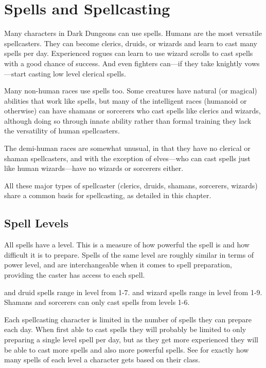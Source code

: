 \chapter[red]{Spells and Spellcasting}
\label{chap:Spells and Spellcasting}
\thispagestyle{plain}

\begin{multicols*}{2}
Many characters in Dark Dungeons can use spells. Humans are the most versatile spellcasters. They can become clerics, druids, or wizards and learn to cast many spells per day. Experienced rogues can learn to use wizard scrolls to cast spells with a good chance of success. And even fighters can—if they take knightly vows—start casting low level clerical spells.

Many non-human races use spells too. Some creatures have natural (or magical) abilities that work like spells, but many of the intelligent races (humanoid or otherwise) can have shamans or sorcerers who cast spells like clerics and wizards, although doing so through innate ability rather than formal training they lack the versatility of human spellcasters.

The demi-human races are somewhat unusual, in that they have no clerical or shaman spellcasters, and with the exception of elves—who can cast spells just like human wizards—have no wizards or sorcerers either.

All these major types of spellcaster (clerics, druids, shamans, sorcerers, wizards) share a common basis for spellcasting, as detailed in this chapter.

\section{Spell Levels}
All spells have a level. This is a measure of how powerful the spell is and how difficult it is to prepare. Spells of the same level are roughly similar in terms of power level, and are interchangeable when it comes to spell preparation, providing the caster has access to each spell.

 and druid spells range in level from 1-7.  and wizard spells range in level from 1-9. Shamans and sorcerers can only cast spells from levels 1-6.

Each spellcasting character is limited in the number of spells they can prepare each day. When first able to cast spells they will probably be limited to only preparing a single  level spell per day, but as they get more experienced they will be able to cast more spells and also more powerful spells. See  for exactly how many spells of each level a character gets based on their class.


\end{multicols*}

